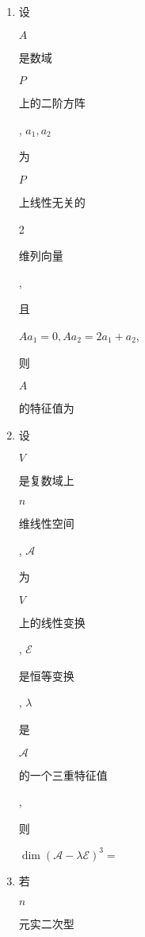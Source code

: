 \documentclass[10pt]{article}
\begin{document}
\begin{enumerate}
  \item \begin{CJK}{UTF8}{mj}设\end{CJK} $A$ \begin{CJK}{UTF8}{mj}是数域\end{CJK} $P$ \begin{CJK}{UTF8}{mj}上的二阶方阵\end{CJK}, $a_{1}, a_{2}$ \begin{CJK}{UTF8}{mj}为\end{CJK} $P$ \begin{CJK}{UTF8}{mj}上线性无关的\end{CJK} 2 \begin{CJK}{UTF8}{mj}维列向量\end{CJK}, \begin{CJK}{UTF8}{mj}且\end{CJK} $A a_{1}=0, A a_{2}=2 a_{1}+a_{2}$, \begin{CJK}{UTF8}{mj}则\end{CJK} $A$ \begin{CJK}{UTF8}{mj}的特征值为\end{CJK}

  \item \begin{CJK}{UTF8}{mj}设\end{CJK} $V$ \begin{CJK}{UTF8}{mj}是复数域上\end{CJK} $n$ \begin{CJK}{UTF8}{mj}维线性空间\end{CJK}, $\mathscr{A}$ \begin{CJK}{UTF8}{mj}为\end{CJK} $V$ \begin{CJK}{UTF8}{mj}上的线性变换\end{CJK}, $\mathscr{E}$ \begin{CJK}{UTF8}{mj}是恒等变换\end{CJK}, $\lambda$ \begin{CJK}{UTF8}{mj}是\end{CJK} $\mathscr{A}$ \begin{CJK}{UTF8}{mj}的一个三重特征值\end{CJK}, \begin{CJK}{UTF8}{mj}则\end{CJK} $\operatorname{dim}(\mathscr{A}-\lambda \mathscr{E})^{3}=$

  \item \begin{CJK}{UTF8}{mj}若\end{CJK} $n$ \begin{CJK}{UTF8}{mj}元实二次型\end{CJK}

\end{enumerate}
\end{document}
